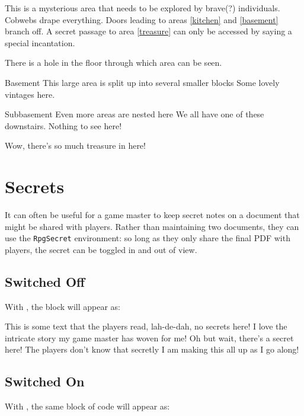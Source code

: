		\begin{RpgMap}[title={Mysterious House},header-offset=2]
			This is a mysterious area that needs to be explored by brave(?) individuals.
			 Cobwebs drape everything. Doors leading to areas \ref{kitchen} and \ref{basement} branch off. A secret passage to area \ref{treasure} can only be accessed by saying a special incantation.

			 There is a hole in the floor through which area  can be seen.

			\begin{RpgArea}[basement]{Basement}
				This large area is split up into several smaller blocks
				 Some lovely vintages here.
				\begin{RpgArea}{Subbasement}
					Even more areas are nested here
					 We all have one of these downstairs. Nothing to see here!
				\end{RpgArea}
			\end{RpgArea}

			 Wow, there's so much treasure in here!
		\end{RpgMap}

	\section{Secrets}

		It can often be useful for a game master to keep secret notes on a document that might be shared with players. Rather than maintaining two documents, they can use the \texttt{RpgSecret} environment: so long as they only share the final PDF with players, the secret can be toggled in and out of view.

		\subsection{Switched Off}
			With , the block will appear as:

			\begin{RpgSecret}{This is some text that the players read, lah-de-dah, no secrets here! I love the intricate story my game master has woven for me!}
				Oh but wait, there's a secret here! The players don't know that secretly I am making this all up as I go along!
			\end{RpgSecret}
		\subsection{Switched On}
			With , the same block of code will appear as:

